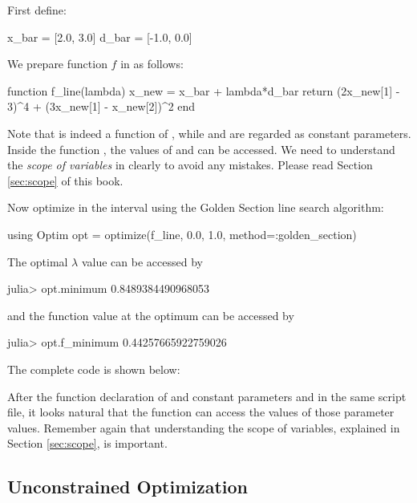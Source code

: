First define:
\begin{code}
x_bar = [2.0, 3.0]
d_bar = [-1.0, 0.0]
\end{code}
We prepare function $f$ in \julia{} as follows:
\begin{code}
function f_line(lambda)
    x_new = x_bar + lambda*d_bar
    return (2x_new[1] - 3)^4 + (3x_new[1] - x_new[2])^2
end
\end{code}
\noindent Note that  is indeed a function of , while  and  are regarded as constant parameters. Inside the function , the values of  and  can be accessed. We need to understand the \emph{scope of variables} in \julia{} clearly to avoid any mistakes. Please read Section \ref{sec:scope} of this book.

Now optimize  in the interval \kode{[0.0, 1.0]} using the Golden Section line search algorithm:
\begin{code}
using Optim
opt = optimize(f_line, 0.0, 1.0, method=:golden_section)
\end{code}
The optimal $\lambda$ value can be accessed by
\begin{code}
julia> opt.minimum
0.8489384490968053
\end{code}
\noindent and the function value at the optimum can be accessed by
\begin{code}
julia> opt.f_minimum
0.44257665922759026
\end{code}

The complete code is shown below:
\begin{codelisting}
\end{codelisting}

After the function declaration of  and constant parameters  and  in the same script file, it looks natural that the function  can access the values of those parameter values. Remember again that understanding the scope of variables, explained in Section \ref{sec:scope}, is important.


\subsection{Unconstrained Optimization}

